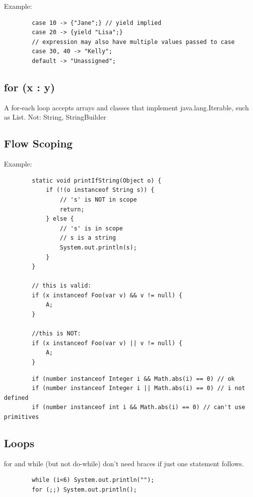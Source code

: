 \documentclass{scrartcl}
\begin{document}
    Example:

    \begin{lstlisting}
        case 10 -> {"Jane";} // yield implied
        case 20 -> {yield "Lisa";}
        // expression may also have multiple values passed to case
        case 30, 40 -> "Kelly";
        default -> "Unassigned";
    \end{lstlisting}

\subsection{ for (x : y)}

     A for-­each loop accepts arrays and classes that implement java.lang.Iterable, such as List. Not: String, StringBuilder

\subsection{Flow Scoping}

    Example:

    \begin{lstlisting}
        static void printIfString(Object o) {
            if (!(o instanceof String s)) {
                // 's' is NOT in scope
                return;
            } else {
                // 's' is in scope
                // s is a string
                System.out.println(s);
            }
        }

        // this is valid:
        if (x instanceof Foo(var v) && v != null) {
            A;
        }

        //this is NOT:
        if (x instanceof Foo(var v) || v != null) {
            A;
        }
    \end{lstlisting}

    \begin{lstlisting}
        if (number instanceof Integer i && Math.abs(i) == 0) // ok
        if (number instanceof Integer i || Math.abs(i) == 0) // i not defined
        if (number instanceof int i && Math.abs(i) == 0) // can't use primitives
    \end{lstlisting}

\subsection{Loops}

    for and while (but not do-while) don't need braces if just one statement follows.

    \begin{lstlisting}
        while (i<6) System.out.println("");
        for (;;) System.out.println();
    \end{lstlisting}
\end{document}
